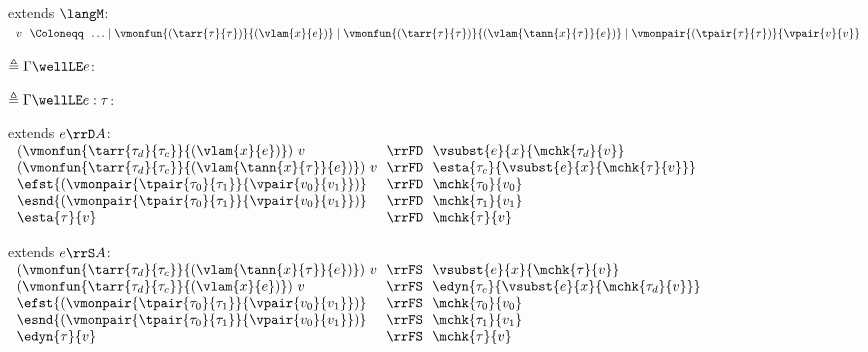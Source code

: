 \begin{flushleft}

 extends $\langM$:\\
$\begin{array}{l@{~~}c@{~~}l}
  v & \Coloneqq & \ldots \mid \vmonfun{(\tarr{\tau}{\tau})}{(\vlam{x}{e})} \mid
      \vmonfun{(\tarr{\tau}{\tau})}{(\vlam{\tann{x}{\tau}}{e})} \mid
      \vmonpair{(\tpair{\tau}{\tau})}{\vpair{v}{v}}
\end{array}$

\bigskip
\begin{minipage}[t]{\columnwidth}
 $\triangleq \Gamma \wellLE e$:
\end{minipage}%
\begin{minipage}[t]{\columnwidth}
 $\triangleq \Gamma \wellLE e : \tau$:
\end{minipage}


\medskip
\begin{minipage}[t]{\columnwidth}
 extends $e \rrD A$:\\
$\begin{array}{l@{~~}c@{~~}l}
  (\vmonfun{\tarr{\tau_d}{\tau_c}}{(\vlam{x}{e})})~v & \rrFD & \vsubst{e}{x}{\mchk{\tau_d}{v}}
\\
  (\vmonfun{\tarr{\tau_d}{\tau_c}}{(\vlam{\tann{x}{\tau}}{e})})~v & \rrFD & \esta{\tau_c}{\vsubst{e}{x}{\mchk{\tau}{v}}}
\\
  \efst{(\vmonpair{\tpair{\tau_0}{\tau_1}}{\vpair{v_0}{v_1}})} & \rrFD & \mchk{\tau_0}{v_0}
\\
  \esnd{(\vmonpair{\tpair{\tau_0}{\tau_1}}{\vpair{v_0}{v_1}})} & \rrFD & \mchk{\tau_1}{v_1}
\\
  \esta{\tau}{v} & \rrFD & \mchk{\tau}{v}
\end{array}$
\end{minipage}%
\begin{minipage}[t]{\columnwidth}
 extends $e \rrS A$:\\
$\begin{array}{l@{~~}c@{~~}l}
  (\vmonfun{\tarr{\tau_d}{\tau_c}}{(\vlam{\tann{x}{\tau}}{e})})~v & \rrFS & \vsubst{e}{x}{\mchk{\tau}{v}}
\\
  (\vmonfun{\tarr{\tau_d}{\tau_c}}{(\vlam{x}{e})})~v & \rrFS & \edyn{\tau_c}{\vsubst{e}{x}{\mchk{\tau_d}{v}}}
\\
  \efst{(\vmonpair{\tpair{\tau_0}{\tau_1}}{\vpair{v_0}{v_1}})} & \rrFS & \mchk{\tau_0}{v_0}
\\
  \esnd{(\vmonpair{\tpair{\tau_0}{\tau_1}}{\vpair{v_0}{v_1}})} & \rrFS & \mchk{\tau_1}{v_1}
\\
  \edyn{\tau}{v} & \rrFS & \mchk{\tau}{v}
\end{array}$
\end{minipage}


\end{flushleft}
